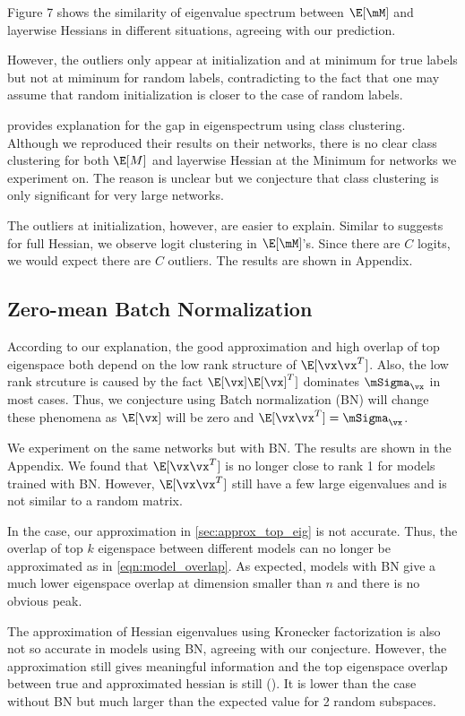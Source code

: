 Figure 7 shows the similarity of eigenvalue spectrum between $\E[\mM]$ and layerwise Hessians in different situations, agreeing with our prediction.

However, the outliers only appear at initialization and at minimum for true labels but not at miminum for random labels, contradicting to the fact that one may assume that random initialization is closer to the case of random labels. 

\citet{papyan2019measurements} provides explanation for the gap in eigenspectrum using class clustering. Although we reproduced their results on their networks, there is no clear class clustering for both $\E[M]$ and layerwise Hessian at the Minimum for networks we experiment on. The reason is unclear but we conjecture that class clustering is only significant for very large networks.

The outliers at initialization, however, are easier to explain. Similar to \citet{papyan2019measurements} suggests for full Hessian, we observe logit clustering in $\E[\mM]$'s. Since there are $C$ logits, we would expect there are $C$ outliers. The results are shown in Appendix.

\subsection{Zero-mean Batch Normalization}
According to our explanation, the good approximation and high overlap of top eigenspace both depend on the low rank structure of $\E[\vx\vx^T]$. Also, the low rank strcuture is caused by the fact $\E[\vx]\E[\vx]^T]$ dominates $\mSigma_\vx$ in most cases. Thus, we conjecture using Batch normalization (BN) \citep{ioffe2015batch} will change these phenomena as $\E[\vx]$ will be zero and $\E[\vx\vx^T] = \mSigma_\vx$.

We experiment on the same networks but with BN. The results are shown in the Appendix. We found that $\E[\vx\vx^T]$ is no longer close to rank 1 for models trained with BN. However, $\E[\vx\vx^T]$ still have a few large eigenvalues and is not similar to a random matrix.

In the case, our approximation in \cref{sec:approx_top_eig} is not accurate. Thus, the overlap of top $k$ eigenspace between different models can no longer be approximated as in \cref{eqn:model_overlap}. As expected, models with BN give a much lower eigenspace overlap at dimension smaller than $n$ and there is no obvious peak.

The approximation of Hessian eigenvalues using Kronecker factorization is also not so accurate in models using BN, agreeing with our conjecture. However, the approximation still gives meaningful information and the top eigenspace overlap between true and approximated hessian is still (). It is lower than the case without BN but much larger than the expected value for 2 random subspaces.